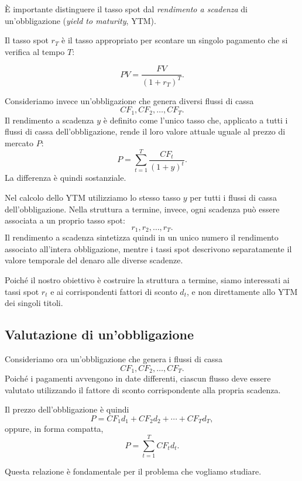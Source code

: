 È importante distinguere il tasso spot dal
\emph{rendimento a scadenza} di un'obbligazione
(\emph{yield to maturity}, YTM).

Il tasso spot $r_T$ è il tasso appropriato per scontare un
singolo pagamento che si verifica al tempo $T$:

\begin{equation*}
    PV=
    \frac{FV}{(1+r_T)^T}.
\end{equation*}

Consideriamo invece un'obbligazione che genera diversi flussi di
cassa
$$    CF_1,CF_2,\ldots,CF_T.$$
Il rendimento a scadenza $y$ è definito come l'unico tasso che,
applicato a tutti i flussi di cassa dell'obbligazione, rende il
loro valore attuale uguale al prezzo di mercato $P$:
$$
P=
    \sum_{t=1}^{T}
    \frac{CF_t}{(1+y)^t}.
    \label{eq:ytm}
$$
La differenza è quindi sostanziale.

Nel calcolo dello YTM utilizziamo lo stesso tasso $y$ per tutti
i flussi di cassa dell'obbligazione. Nella struttura a termine,
invece, ogni scadenza può essere associata a un proprio tasso
spot:
$$
    r_1,r_2,\ldots,r_T.
$$
Il rendimento a scadenza sintetizza quindi in un unico numero il
rendimento associato all'intera obbligazione, mentre i tassi spot
descrivono separatamente il valore temporale del denaro alle
diverse scadenze.

Poiché il nostro obiettivo è costruire la struttura a termine,
siamo interessati ai tassi spot $r_t$ e ai corrispondenti fattori
di sconto $d_t$, e non direttamente allo YTM dei singoli titoli.


\subsection{Valutazione di un'obbligazione}

Consideriamo ora un'obbligazione che genera i flussi di cassa
$$
    CF_1,CF_2,\ldots,CF_T.
$$
Poiché i pagamenti avvengono in date differenti, ciascun flusso
deve essere valutato utilizzando il fattore di sconto
corrispondente alla propria scadenza.

Il prezzo dell'obbligazione è quindi
$$
    P=
    CF_1d_1+
    CF_2d_2+
    \cdots+
    CF_Td_T,
$$
oppure, in forma compatta,
\begin{equation}
    P=
    \sum_{t=1}^{T}CF_td_t.
    \label{eq:bond-discount-factors}
\end{equation}

Questa relazione è fondamentale per il problema che vogliamo
studiare.

